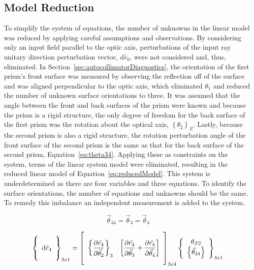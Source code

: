 \subsection{Model Reduction}
To simplify the system of equations, the number of unknowns in the linear model was reduced by applying careful assumptions and observations. By considering only an input field parallel to the optic axis, perturbations of the input ray unitary direction perturbation vector, d$\hat{r}_0$, were not considered and, thus, eliminated. In Section~\ref{sec:autocollimatorDiagnostics}, the orientation of the first prism's front surface was measured by observing the reflection off of the surface and was aligned perpendicular to the optic axis, which eliminated $\theta_1$ and reduced the number of unknown surface orientations to three. It was assumed that the angle between the front and back surfaces of the prism were known and because the prism is a rigid structure, the only degree of freedom for the back surface of the first prism was the rotation about the optical axis, $\left \{ \theta_2 \right \}_Z$. Lastly, because the second prism is also a rigid structure, the rotation perturbation angle of the front surface of the second prism is the same as that for the back surface of the second prism, Equation~\eqref{eq:theta34}. Applying these as constraints on the system, terms of the linear system model were eliminated, resulting in the reduced linear model of Equation~\eqref{eq:reducedModel}. This system is underdetermined as there are four variables and three equations. To identify the surface orientations, the number of equations and unknowns should be the same. To remedy this imbalance an independent measurement is added to the system.

\begin{equation}		%
\label{eq:theta34}
\vec{\theta}_{34} = \vec{\theta}_3 = \vec{\theta}_4
\end{equation}

\begin{equation}		%
\label{eq:reducedModel}
\left \{
	\begin{array}{c}
	\hspace{5mm} \\
	\textrm{d}\hat{r}_{4} \\
	\hspace{5mm}
	\end{array}
\right \}_{3x1} = 
\left [ 
	\begin{array}{cc}
	\hspace{5mm} \\
	\left \{ \dfrac{\partial\hat{r_4}}{\partial\vec{\theta}_2} \right \}_3 & 
	\left [ \dfrac{\partial\hat{r_4}}{\partial\vec{\theta}_3} + \dfrac{\partial\hat{r_4}}{\partial\vec{\theta}_4} \right ] \\
	\hspace{5mm}
	\end{array}
\right ]_{3x4}
\left \{
	\begin{array}{c}
	\theta_{Z2} \\
	\left \{ \vec{\theta}_{34} \right \}
	\end{array}
\right \}_{4x1}
\end{equation}

